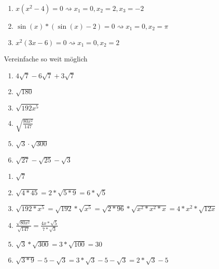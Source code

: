 \begin{lsg}{}
  \begin{enumerate}
    \item $x(x^2-4) = 0 \rightsquigarrow x_1=0, x_2=2, x_3=-2$
    \item $\sin(x)*(\sin(x)-2) = 0 \rightsquigarrow x_1=0, x_2=\pi$
    \item $x^2(3x-6)=0 \rightsquigarrow x_1=0, x_2=2$
  \end{enumerate}
\end{lsg}





 Vereinfache so weit möglich
\begin{multicols}{3}
  \begin{enumerate}
    \item $4\sqrt{7}-6\sqrt{7} + 3\sqrt{7}$
    \item $\sqrt{180}$
    \item $\sqrt{192x^5}$
    \item $\sqrt{\frac{80x^2}{147}}$
    \item $\sqrt{3}\cdot\sqrt{300}$
    \item $\sqrt{27}-\sqrt{25}-\sqrt{3}$
  \end{enumerate}
\end{multicols}

\begin{lsg}{}
  \begin{multicols}{3}
    \begin{enumerate}
      \item $\sqrt{7}$
      \item $\sqrt{4*45}=2*\sqrt{5*9}=6*\sqrt 5$
      \item $\sqrt{192*x^5}=\sqrt{192}*\sqrt{x^5}=\sqrt{2*96}*\sqrt{x^2*x^2*x}=4*x^2*\sqrt{12x}$
      \item $\frac{\sqrt{80x^2}}{\sqrt{147}} = \frac{4x*\sqrt{5}}{7*\sqrt{3}}$
      \item $\sqrt{3}*\sqrt{300}=3*\sqrt{100}=30$
      \item $\sqrt{3*9}-5-\sqrt{3}=3*\sqrt{3}-5-\sqrt{3}=2*\sqrt{3}-5$
    \end{enumerate}
  \end{multicols}
\end{lsg}





